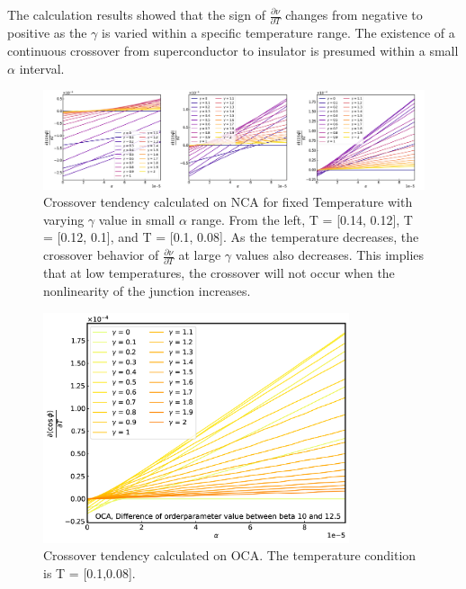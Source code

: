 \documentclass{article}[12pt]
\begin{document}
\begin{spacing}{1.3}
The calculation results showed that the sign of $\frac{\partial \nu}{\partial T}$ changes from negative to positive 
as the $\gamma$ is varied within a specific temperature range. The existence of a continuous crossover from superconductor 
to insulator is presumed within a small $\alpha$ interval.
\pagebreak
\begin{figure}[H]
  \vfill
  \centerline{\includegraphics[width=15cm]{TexFigure/4/4_3_13_litlalp_1.png}}
  \caption{Crossover tendency calculated on NCA for fixed Temperature with varying $\gamma$ value in small $\alpha$ range. From the left, T = [0.14, 0.12], T = [0.12, 0.1], and T = [0.1, 0.08]. As the temperature decreases, the crossover behavior of $\frac{\partial \nu}{\partial T}$ 
  at large $\gamma$ values also decreases. This implies that at low temperatures, the crossover will not occur when the nonlinearity of the junction increases.}
  \vfill
\end{figure}
\begin{figure}[H]
  \centerline{\includegraphics[width=9cm]{TexFigure/4/4_3_14_Diff_Os3_b_10_12.5_n.png}}
  \caption{Crossover tendency calculated on OCA. The temperature condition is T = [0.1,0.08].}
\vfill
\end{figure}
\pagebreak
\begin{figure}[H]
  \vfill

\end{figure}
\end{spacing}
\end{document}
